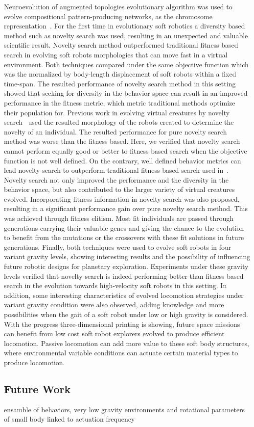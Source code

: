 \documentclass{sig-alternate}
\begin{document}
Neuroevolution of augmented topologies evolutionary algorithm was used to evolve compositional pattern-producing networks, as the chromosome representation~\cite{cheney2013unshackling}. For the first time in evolutionary soft robotics a diversity based method such as novelty search was used, resulting in an unexpected and valuable scientific result. Novelty search method outperformed traditional fitness based search in evolving soft robots morphologies that can move fast in a virtual environment. Both techniques compared under the same objective function which was the normalized by body-length displacement of soft robots within a fixed time-span. The resulted performance of novelty search method in this setting showed that seeking for diversity in the behavior space can result in an improved performance in the fitness metric, which metric traditional methods optimize their population for. Previous work in evolving virtual creatures by novelty search~\cite{lehman2011evolving} used the resulted morphology of the robots created to determine the novelty of an individual. The resulted performance for pure novelty search method was worse than the fitness based. Here, we verified that novelty search cannot perform equally good or better to fitness based search when the objective function is not well defined. On the contrary, well defined behavior metrics can lead novelty search to outperform traditional fitness based search used in~\cite{cheney2013unshackling}. Novelty search not only improved the performance and the diversity in the behavior space, but also contributed to the larger variety of virtual creatures evolved. Incorporating fitness information in novelty search was also proposed, resulting in a significant performance gain over pure novelty search method. This was achieved through fitness elitism. Most fit individuals are passed through generations carrying their valuable genes and giving the chance to the evolution to benefit from the mutations or the crossovers with these fit solutions in future generations. Finally, both techniques were used to evolve soft robots in four variant gravity levels, showing interesting results and the possibility of influencing future robotic designs for planetary exploration. Experiments under these gravity levels verified that novelty search is indeed performing better than fitness based search in the evolution towards high-velocity soft robots in this setting. In addition, some interesting characteristics of evolved locomotion strategies under variant gravity condition were also observed, adding knowledge and more possibilities when the gait of a soft robot under low or high gravity is considered. With the progress three-dimensional printing is showing, future space missions can benefit from low cost soft robot explorers evolved to produce efficient locomotion. Passive locomotion can add more value to these soft body structures, where environmental variable conditions can actuate certain material types to produce locomotion.

\subsection{Future Work}
ensamble of behaviors, very low gravity environments and rotational parameters of small body linked to actuation frequency



\end{document}
